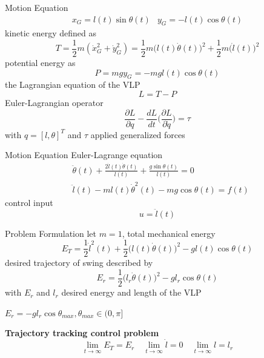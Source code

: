 \documentclass[10pt]{beamer}
\begin{document}
  \begin{frame}{Motion Equation}
    \begin{eqnarray*}
      x_G = l(t)\sin\theta(t) &  y_G = -l(t)\cos\theta(t) 
    \end{eqnarray*}
    kinetic energy defined as
    \begin{equation*}
      T = \frac{1}{2}m(\dot{x}_G^2+\dot{y}_G^2) = \frac{1}{2}m\big(l(t)\dot{\theta}(t)\big)^2+\frac{1}{2}m\big(\dot{l}(t)\big)^2 
    \end{equation*}
    potential energy as
    \begin{equation*}
      P = mgy_G = -mgl(t)\cos\theta(t)  
    \end{equation*}
    the Lagrangian equation of the VLP
    \begin{equation*}
      L = T-P
    \end{equation*}
    Euler-Lagrangian operator 
    \begin{equation*}\label{model}
      \frac{\partial L}{\partial q}   -\frac{dL}{dt}\Bigg(\frac{\partial L}{\partial \dot{q}}\Bigg) = \tau
    \end{equation*}
  with $q = [l, \theta]^T$ and $\tau$ applied generalized forces
  \end{frame}

  \begin{frame}{Motion Equation}
    Euler-Lagrange equation
    \begin{align*}
      &\ddot{\theta}(t)+\frac{2\dot{l}(t)\dot{\theta}(t)}{l(t)}+
        \frac{g\sin\theta(t)}{l(t)} = 0  \\
      &\ddot{l}(t)-ml(t)\dot{\theta}^2(t)-mg\cos\theta(t) = f(t)
    \end{align*}
    control input
    \begin{equation*}
      u = \ddot{l}(t)
    \end{equation*}
  \end{frame}

  \begin{frame}{Problem Formulation}
    let $m=1$, total mechanical energy
    \begin{equation*}
      E_T = %
        \frac{1}{2}\dot{l}^2(t)+\frac{1}{2}\big(l(t)\dot{\theta}(t)\big)^2-
        gl(t)\cos\theta(t) 
    \end{equation*}
    desired trajectory of swing described by
    \begin{equation*}
      E_r = \frac{1}{2}\big(l_r\dot{\theta}(t)\big)^2-gl_r\cos\theta(t) 
    \end{equation*}
    with $E_r$ and $l_r$ desired energy and length of the VLP
    
    \vspace{0.4cm}
    
    $E_r = -gl_r\cos\theta_{max}, \theta_{max} \in (0,\pi]$

    \vspace{0.1cm}
    \textbf{Trajectory tracking control problem}
    \begin{equation*}
      \lim_{t\rightarrow \infty} E_T = E_r  \quad
      \lim_{t\rightarrow \infty} \dot{l} = 0 \quad
      \lim_{t\rightarrow \infty} l = l_r
    \end{equation*}
  \end{frame}
\end{document}
